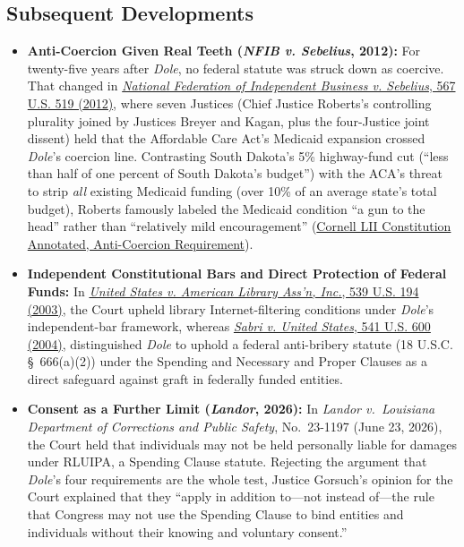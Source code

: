 \documentclass[12pt]{article}
\begin{document}
\subsection{Subsequent Developments}

\begin{itemize}

\item \textbf{Anti-Coercion Given Real Teeth (\textit{NFIB v. Sebelius}, 2012):} For twenty-five years after \textit{Dole}, no federal statute was struck down as coercive. That changed in \href{https://supreme.justia.com/cases/federal/us/567/519/}{\textit{National Federation of Independent Business v. Sebelius}, 567 U.S. 519 (2012)}, where seven Justices (Chief Justice Roberts's controlling plurality joined by Justices Breyer and Kagan, plus the four-Justice joint dissent) held that the Affordable Care Act's Medicaid expansion crossed \textit{Dole}'s coercion line. Contrasting South Dakota's 5\% highway-fund cut (``less than half of one percent of South Dakota's budget'') with the ACA's threat to strip \textit{all} existing Medicaid funding (over 10\% of an average state's total budget), Roberts famously labeled the Medicaid condition ``a gun to the head'' rather than ``relatively mild encouragement'' (\href{https://www.law.cornell.edu/constitution-conan/article-1/section-8/clause-1/anti-coercion-requirement-and-spending-clause}{Cornell LII Constitution Annotated, Anti-Coercion Requirement}).
  \item \textbf{Independent Constitutional Bars and Direct Protection of Federal Funds:} In \href{https://supreme.justia.com/cases/federal/us/539/194/}{\textit{United States v. American Library Ass'n, Inc.}, 539 U.S. 194 (2003)}, the Court upheld library Internet-filtering conditions under \textit{Dole}'s independent-bar framework, whereas \href{https://www.law.cornell.edu/supct/pdf/03-44P.ZS}{\textit{Sabri v. United States}, 541 U.S. 600 (2004)}, distinguished \textit{Dole} to uphold a federal anti-bribery statute (18 U.S.C. \S~666(a)(2)) under the Spending and Necessary and Proper Clauses as a direct safeguard against graft in federally funded entities.

\item \textbf{Consent as a Further Limit (\textit{Landor}, 2026):} In \textit{Landor v.\ Louisiana Department of Corrections and Public Safety}, No.~23-1197 (June 23, 2026), the Court held that individuals may not be held personally liable for damages under RLUIPA, a Spending Clause statute. Rejecting the argument that \textit{Dole}'s four requirements are the whole test, Justice Gorsuch's opinion for the Court explained that they ``apply in addition to---not instead of---the rule that Congress may not use the Spending Clause to bind entities and individuals without their knowing and voluntary consent.''
\end{itemize}
\end{document}
